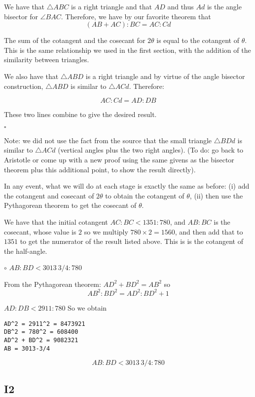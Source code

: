 \documentclass[11pt, oneside]{article}
\begin{document}
We have that $\triangle ABC$ is a right triangle and that $AD$ and thus $Ad$ is the angle bisector for $\angle BAC$.  Therefore, we have by our favorite theorem that
\[ (AB + AC):BC =  AC:Cd \]

The sum of the cotangent and the cosecant for $2 \theta$ is equal to the cotangent of $\theta$.  This is the same relationship we used in the first section, with the addition of the similarity between triangles.  

We also have that $\triangle ABD$ is a right triangle and by virtue of the angle bisector construction, $\triangle ABD$ is similar to $\triangle ACd$.  Therefore:

\[ AC:Cd = AD:DB \]

These two lines combine to give the desired result.

$\square$

Note:  we did not use the fact from the source that the small triangle $\triangle BDd$ is similar to $\triangle ACd$ (vertical angles plus the two right angles).  (To do:  go back to Aristotle or come up with a new proof using the same givens as the bisector theorem plus this additional point, to show the result directly).

In any event, what we  will do at each stage is exactly the same as before:  (i) add the cotangent and cosecant of $2 \theta$ to obtain the cotangent of $\theta$, (ii) then use the Pythagorean theorem to get the cosecant of $\theta$.

We have that the initial cotangent $AC : BC < 1351 : 780$, and $AB:BC$ is the cosecant, whose value is $2$ so we multiply $780 \times 2 = 1560$, and then add that to $1351$ to get the numerator of the result listed above.  This is is the cotangent of the half-angle.

$\circ$  $AB : BD < 3013 \ 3/4 : 780$

From the Pythagorean theorem:  $AD^2 + BD^2 = AB^2$ so
\[ AB^2:BD^2 = AD^2:BD^2 + 1 \]

$AD : DB < 2911 : 780$  So we obtain 

\begin{verbatim}
AD^2 = 2911^2 = 8473921
DB^2 = 780^2 = 608400
AD^2 + BD^2 = 9082321
AB = 3013-3/4
\end{verbatim}

\[ AB:BD <  3013 \ 3/4: 780 \]

\subsection*{I2}
\end{document}
